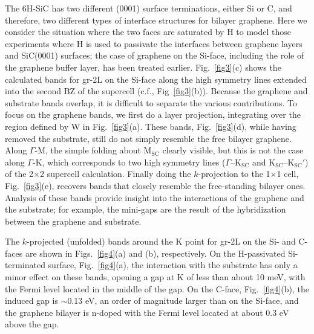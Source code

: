 \documentclass[aps,prb,showpacs,twocolumn,reprint,superscriptaddress]{revtex4-1}
\begin{document}
The 6H-SiC has two different (0001) surface terminations, either Si or C, and therefore, two different types of
interface structures for bilayer graphene.  Here we consider the situation where the two faces are saturated by
H to model those  experiments where H is used to passivate the interfaces between graphene layers and SiC(0001)
surfaces;\cite{Riedl2009,Riedl2010,Rajput2013} the case of graphene on the Si-face, including the role of
the graphene buffer layer, has been treated earlier.\cite{Qi2010Epitaxial}
Fig.~\ref{fig3}(c) shows the calculated bands for gr-2L on the Si-face along the high symmetry lines extended
into the second BZ of the supercell (c.f., Fig~\ref{fig3}(b)). Because the graphene and substrate bands overlap,
it is difficult to separate the various contributions. To focus on the graphene bands, we first do a layer
projection, integrating over the region defined by W in Fig.~\ref{fig3}(a). These bands, Fig.~\ref{fig3}(d),
while having removed the substrate, still do not simply resemble the free bilayer graphene. Along $\Gamma$-M,
the simple folding about M$_\mathrm{SC}$ clearly visible, but this is not the case along $\Gamma$-K, which
corresponds to two high symmetry lines ($\Gamma$--K$_\mathrm{SC}$ and K$_\mathrm{SC}$--K$_\mathrm{SC}'$) of
the 2$\times$2 supercell calculation. Finally doing the $k$-projection to the 1$\times$1 cell,
Fig.~\ref{fig3}(e), recovers bands that closely resemble the free-standing bilayer ones. Analysis of these
bands provide insight into the interactions of the graphene and the substrate; for example, the mini-gaps
are the result of the hybridization between the graphene and substrate.


The $k$-projected (unfolded) bands around the K point for gr-2L on the Si- and C-faces are shown in
Figs.~\ref{fig4}(a) and (b), respectively. On the H-passivated Si-terminated surface, 
Fig.~\ref{fig4}(a), the interaction with the substrate has only a minor effect on these bands, opening a
gap at K of less than about 10 meV, with the Fermi level located in the middle of the gap.
On the C-face, Fig.~\ref{fig4}(b), the induced gap is $\sim$0.13 eV, an order of magnitude larger than on the
Si-face, and the graphene bilayer is n-doped with the Fermi level located at about 0.3 eV above the gap.
\end{document}

